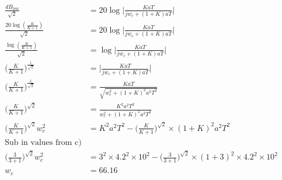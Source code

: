 \documentclass{report}
\begin{document}
\begin{align*}
    \frac{dB_{low}}{\sqrt{2}} &= 20\log\bigg|\frac{KaT}{jw_c + (1+K)aT}\bigg|\\
    \frac{20 \log(\frac{K}{K+1})}{\sqrt{2}} &= 20\log\bigg|\frac{KaT}{jw_c + (1+K)aT}\bigg|\\
    \frac{\log(\frac{K}{K+1})}{\sqrt{2}} &= \log\bigg|\frac{KaT}{jw_c + (1+K)aT}\bigg|\\
    \bigg(\frac{K}{K+1}\bigg)^{\frac{1}{\sqrt{2}}} &=\bigg|\frac{KaT}{jw_c + (1+K)aT}\bigg|\\
    \bigg(\frac{K}{K+1}\bigg)^{\frac{1}{\sqrt{2}}} &=\frac{KaT}{\sqrt{w_c^2 + (1+K)^2a^2T^2}}\\
    \bigg(\frac{K}{K+1}\bigg)^{\sqrt{2}} &=\frac{K^2a^2T^2}{w_c^2 + (1+K)^2a^2T^2}\\
    \bigg(\frac{K}{K+1}\bigg)^{\sqrt{2}}w_c^2 &= K^2a^2T^2 - \bigg(\frac{K}{K+1}\bigg)^{\sqrt{2}} \times (1+K)^2a^2T^2\\
    \text{Sub in values from c)}\\
    \bigg(\frac{3}{3+1}\bigg)^{\sqrt{2}}w_c^2 &= 3^2\times 4.2^2 \times 10^2 - \bigg(\frac{3}{3+1}\bigg)^{\sqrt{2}} \times (1+3)^2 \times 4.2^2 \times 10^2\\
    w_c & = 66.16
\end{align*}


\end{document}
